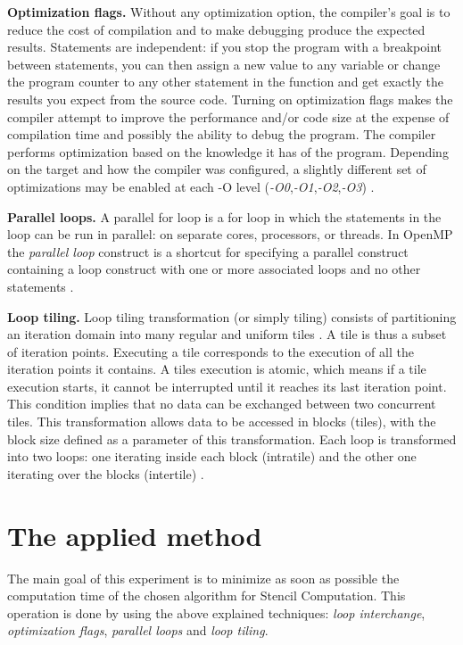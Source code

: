 \documentclass[conference]{IEEEtran}
\newcommand{\mypar}[1]{{\bf #1.}}
\begin{document}
\mypar{Optimization flags}
Without any optimization option, the compiler's goal is to reduce the cost of compilation and to make debugging produce the expected results. Statements are independent: if you stop the program with a breakpoint between statements, you can then assign a new value to any variable or change the program counter to any other statement in the function and get exactly the results you expect from the source code. 
Turning on optimization flags makes the compiler attempt to improve the performance and/or code size at the expense of compilation time and possibly the ability to debug the program. 
The compiler performs optimization based on the knowledge it has of the program. 
Depending on the target and how the compiler was configured, a slightly different set of optimizations may be enabled at each -O level (\textit{-O0},\textit{-O1},\textit{-O2},\textit{-O3}) \cite{optimization-flags}.

\mypar{Parallel loops}
A parallel for loop is a for loop in which the statements in the loop can be run in parallel: on separate cores, processors, or threads. 
In OpenMP the \textit{parallel loop} construct is a shortcut for specifying a parallel construct containing a loop construct with one or more associated loops and no other statements \cite{omp-parallel}. 

\mypar{Loop tiling}
Loop tiling transformation (or simply tiling) consists of partitioning an iteration domain into many regular and uniform tiles \cite{barigou}. A tile is thus a subset of iteration points. Executing a tile corresponds to the execution of all the iteration points it contains. A tiles execution is atomic, which means if a tile execution starts, it cannot be interrupted until it reaches its last iteration point. This condition implies that no data can be exchanged between two concurrent tiles. This transformation allows data to be accessed in blocks (tiles), with the block size defined as a parameter of this transformation. Each loop is transformed into two loops: one iterating inside each block (intratile) and the other one iterating over the blocks (intertile) \cite{loop-tiling}. 

\section{The applied method}\label{sec:yourmethod}

The main goal of this experiment is to minimize as soon as possible the computation time of the chosen algorithm for Stencil Computation. This operation is done by using the above explained techniques: \textit{loop interchange}, \textit{optimization flags}, \textit{parallel loops} and \textit{loop tiling}.
\end{document}
